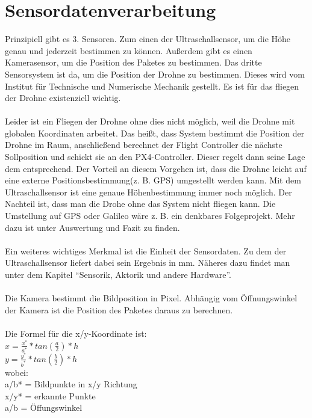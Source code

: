 \section{Sensordatenverarbeitung}
Prinzipiell gibt es 3. Sensoren. Zum einen der Ultraschallsensor, um die Höhe genau und jederzeit bestimmen zu können. Außerdem gibt es einen Kamerasensor, um die Position des Paketes zu bestimmen. Das dritte Sensorsystem ist da, um die Position der Drohne zu bestimmen. Dieses wird vom Institut für Technische und Numerische Mechanik gestellt. Es ist für das fliegen der Drohne existenziell wichtig.\\
\\
Leider ist ein Fliegen der Drohne ohne dies nicht möglich, weil die Drohne mit globalen Koordinaten arbeitet. Das heißt, dass System bestimmt die Position der Drohne im Raum, anschließend berechnet der Flight Controller die nächste Sollposition und schickt sie an den PX4-Controller. Dieser regelt dann seine Lage dem entsprechend. Der Vorteil an diesem Vorgehen ist, dass die Drohne leicht auf eine externe Positionsbestimmung(z. B. GPS) umgestellt werden kann. 
Mit dem Ultraschallsensor ist eine genaue Höhenbestimmung immer noch möglich. Der Nachteil ist, dass man die Drohe ohne das System nicht fliegen kann. Die Umstellung auf GPS oder Galileo wäre z. B. ein denkbares Folgeprojekt. Mehr dazu ist unter Auswertung und Fazit zu finden.\\
\\
Ein weiteres wichtiges Merkmal ist die Einheit der Sensordaten. Zu dem der Ultraschallsensor liefert dabei sein Ergebnis in mm. Näheres dazu findet man unter dem Kapitel ``Sensorik, Aktorik und andere Hardware''.\\
\\
Die Kamera bestimmt die Bildposition in Pixel. Abhängig vom Öffnungswinkel der Kamera ist die Position des Paketes daraus zu berechnen.\\
\\
Die Formel für die x/y-Koordinate ist:\\
$x = \frac{x^*}{a^*} * tan(\frac{a}{2})*h$\\
$y = \frac{y^*}{b^*} * tan(\frac{b}{2})*h$\\
wobei:\\
a/b* = Bildpunkte in x/y Richtung\\
x/y* = erkannte Punkte\\
a/b = Öffungswinkel\\

